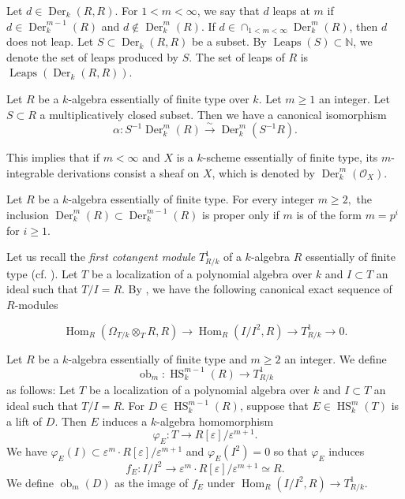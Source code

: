 \documentclass{amsart}
\begin{document}
Let $d\in \operatorname{Der}_k(R,R)$. For $1< m< \infty$, we say that $d$ leaps at $m$ if $d\in \operatorname{Der}_k^{m-1}(R)$ and $d\notin \operatorname{Der}_k^m(R)$. If $d\in \cap_{1<m<\infty} \operatorname{Der}_k^m(R)$, then $d$ does not leap. Let $S\subset \operatorname{Der}_k(R,R)$ be a subset. By $\operatorname{Leaps}(S)\subset \mathbb{N}$, we denote the set of leaps produced by $S$. The set of leaps of $R$ is $\operatorname{Leaps}(\operatorname{Der}_k(R,R))$.

\begin{theorem}[= {\cite[Corollary 2.3.5]{NARVAEZMACARRO20122712}}]
\label{localization}
    Let $R$ be a $k$-algebra essentially of finite type over $k$. Let $m\ge 1$ an integer. Let $S\subset R$ a multiplicatively closed subset. Then we have a canonical isomorphism $$\alpha: S^{-1}\operatorname{Der}_k^m(R)\overset{\sim}{\to} \operatorname{Der}_k^m(S^{-1}R).$$
\end{theorem}

This implies that if $m<\infty$ and $X$ is a $k$-scheme essentially of finite type, its $m$-integrable derivations consist a sheaf on $X$, which is denoted by $\operatorname{Der}_k^m(\mathcal{O}_X)$.

\begin{theorem}[= {\cite[Theorem 4.1]{Her}}]\label{p^n leap} Let $R$ be a $k$-algebra essentially of finite type. For every integer $m\ge 2,$ the inclusion $\operatorname{Der}_k^m(R)\subset \operatorname{Der}_k^{m-1}(R) $ is proper only if $m$ is of the form $m=p^i$ for $i\ge 1$.
\end{theorem}

Let us recall the {\em first cotangent module} $T^1_{R/k}$ of a $k$-algebra $R$ essentially of finite type (cf. \cite[Definition 1.1.6]{Ser}). Let $T$ be a localization of a polynomial algebra over $k$ and $I\subset T$ an ideal such that $T/I=R.$ By \cite[Corollary 1.1.8]{Ser}, we have the following canonical exact sequence of $R$-modules

$$\operatorname{Hom}_R(\Omega_{T/k}\otimes_TR,R)\to \operatorname{Hom}_R(I/I^2,R)\to T^1_{R/k}\to 0.$$

\begin{definition}[{= \cite[Definition 2.11]{miy2025}}]\label{obstruction sp M,Ob}
    Let $R$ be a $k$-algebra essentially of finite type and $m\ge 2 $ an integer. We define $$\operatorname{ob}_m:\operatorname{HS}_k^{m-1}(R)\to T^1_{R/k}$$
    as follows: Let $T$ be a localization of a polynomial algebra over $k$ and $I\subset T$ an ideal such that $T/I=R.$ For $D\in \operatorname{HS}_k^{m-1}(R)$, suppose that $E\in \operatorname{HS}_k^m(T)$ is a lift of $D$. Then $E$ induces a $k$-algebra homomorphism $$\varphi_E :T\to R[\varepsilon]/\varepsilon^{m+1}.$$ We have $\varphi_E(I)\subset\varepsilon^m\cdot R[\varepsilon]/\varepsilon^{m+1}$ and $ \varphi_E(I^2)=0$ so that $\varphi_E$ induces $$f_E:I/I^2\to \varepsilon^m\cdot R[\varepsilon]/\varepsilon^{m+1}\simeq R.$$
 We define $\operatorname{ob}_m(D)$ as the image of $f_E$ under $\operatorname{Hom}_R(I/I^2,R)\to T^1_{R/k}.$ 
\end{definition}
\end{document}
